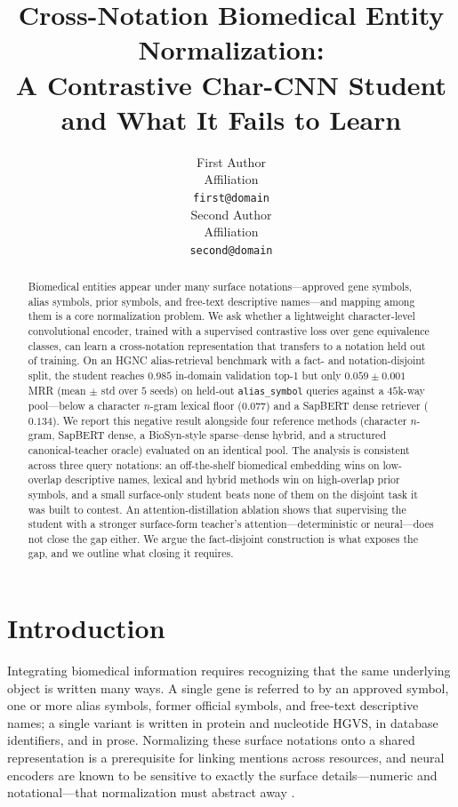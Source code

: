 \documentclass[11pt]{article}
\title{Cross-Notation Biomedical Entity Normalization:\\
       A Contrastive Char-CNN Student and What It Fails to Learn}
\author{First Author \\
  Affiliation \\
  \texttt{first@domain} \\\And
  Second Author \\
  Affiliation \\
  \texttt{second@domain} \\}
\begin{document}
\maketitle

\begin{abstract}
Biomedical entities appear under many surface notations---approved gene symbols,
alias symbols, prior symbols, and free-text descriptive names---and mapping among
them is a core normalization problem. We ask whether a lightweight character-level
convolutional encoder, trained with a supervised contrastive loss over gene
equivalence classes, can learn a cross-notation representation that transfers to a
notation held out of training. On an HGNC alias-retrieval benchmark with a
fact- and notation-disjoint split, the student reaches $0.985$ in-domain
validation top-1 but only $0.059 \pm 0.001$ MRR (mean $\pm$ std over $5$ seeds) on
held-out \texttt{alias\_symbol} queries
against a $45$k-way pool---below a character $n$-gram lexical floor ($0.077$) and a
SapBERT dense retriever ($0.134$). We report this negative result alongside four
reference methods (character $n$-gram, SapBERT dense, a BioSyn-style sparse--dense
hybrid, and a structured canonical-teacher oracle) evaluated on an identical pool.
The analysis is consistent across three query notations: an off-the-shelf
biomedical embedding wins on low-overlap descriptive names, lexical and hybrid
methods win on high-overlap prior symbols, and a small surface-only student beats
none of them on the disjoint task it was built to contest. An
attention-distillation ablation shows that supervising the student with a stronger
surface-form teacher's attention---deterministic or neural---does not close the gap
either. We argue the fact-disjoint construction is what exposes the gap, and we
outline what closing it requires.
\end{abstract}

\section{Introduction}
\label{sec:intro}
Integrating biomedical information requires recognizing that the same underlying
object is written many ways. A single gene is referred to by an approved symbol,
one or more alias symbols, former official symbols, and free-text descriptive
names; a single variant is written in protein and nucleotide HGVS, in database
identifiers, and in prose. Normalizing these surface notations onto a shared
representation is a prerequisite for linking mentions across resources, and neural
encoders are known to be sensitive to exactly the surface details---numeric and
notational---that normalization must abstract away
\citep{wallace2019, xval, thawani2021representing}.
\end{document}
